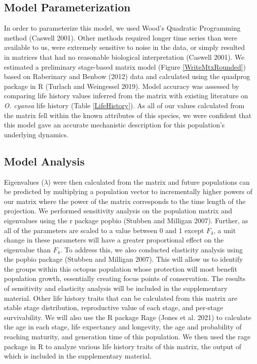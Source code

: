 \documentclass[
]{article}
\begin{document}
\hypertarget{model-parameterization}{%
\subsection{Model Parameterization}\label{model-parameterization}}

In order to parameterize this model, we used Wood's Quadratic Programming method (Caswell 2001). Other methods required longer time series than were available to us, were extremely sensitive to noise in the data, or simply resulted in matrices that had no reasonable biological interpretation (Caswell 2001). We estimated a preliminary stage-based matrix model (Figure \ref{WriteMtxRounded}) based on Raberinary and Benbow (2012) data and calculated using the quadprog package in R (Turlach and Weingessel 2019). Model accuracy was assessed by comparing life history values inferred from the matrix with existing literature on \emph{O. cyanea} life history (Table \ref{LifeHistory}). As all of our values calculated from the matrix fell within the known attributes of this species, we were confident that this model gave an accurate mechanistic description for this population's underlying dynamics.

\hypertarget{model-analysis}{%
\subsection{Model Analysis}\label{model-analysis}}

Eigenvalues (\(\lambda\)) were then calculated from the matrix and future populations can be predicted by multiplying a population vector to incrementally higher powers of our matrix where the power of the matrix corresponds to the time length of the projection. We performed sensitivity analysis on the population matrix and eigenvalues using the r package popbio (Stubben and Milligan 2007). Further, as all of the parameters are scaled to a value between 0 and 1 except \(F_4\), a unit change in these parameters will have a greater proportional effect on the eigenvalue than \(F_4\). To address this, we also conducted elasticity analysis using the popbio package (Stubben and Milligan 2007). This will allow us to identify the groups within this octopus population whose protection will most benefit population growth, essentially creating focus points of conservation. The results of sensitivity and elasticity analysis will be included in the supplementary material. Other life history traits that can be calculated from this matrix are stable stage distribution, reproductive value of each stage, and per-stage survivability. We will also use the R package Rage (Jones et al. 2021) to calculate the age in each stage, life expectancy and longevity, the age and probability of reaching maturity, and generation time of this population. We then used the rage package in R to analyze various life history traits of this matrix, the output of which is included in the supplementary material.
\end{document}
